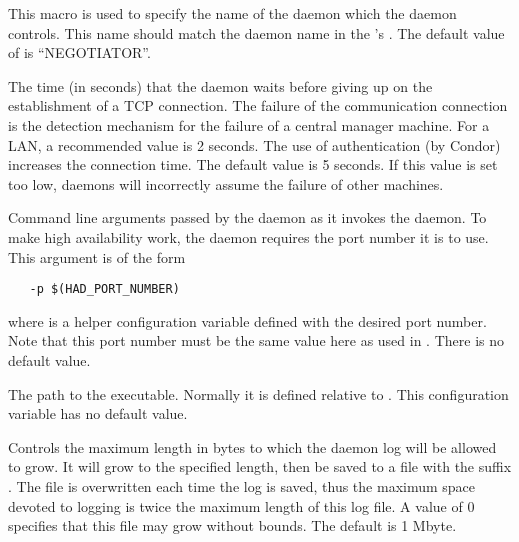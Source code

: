 \begin{description}
\label{param:HADControllee}
\item[\Macro{HAD\_CONTROLLEE}]
  This macro is used to specify the name of the daemon which the
   daemon controls.   This name should match the daemon
  name in the 's .  The default
  value of  is ``NEGOTIATOR''.

\label{param:HADConnectionTimeout}
\item[\Macro{HAD\_CONNECTION\_TIMEOUT}]
  The time (in seconds) that the  daemon waits before giving
  up on the establishment of a TCP connection.
  The failure of the communication connection
  is the detection mechanism for the failure of a central
  manager machine.
  For a LAN, a recommended value is 2 seconds.
  The use of authentication (by Condor) increases the connection
  time.
  The default value is 5 seconds.
  If this value is set too low,
   daemons will incorrectly assume
  the failure of other machines.

\label{param:HADArgs}
\item[\Macro{HAD\_ARGS}]
  Command line arguments passed by the  daemon
  as it invokes the  daemon.
  To make high availability work, the  daemon
  requires the port number it is to use.
  This argument is of the form
  \begin{verbatim}
   -p $(HAD_PORT_NUMBER)
  \end{verbatim}
  where  is a helper configuration variable
  defined with the desired port number.
  Note that this port number must be the same value here as
  used in .
  There is no default value.


\label{param:HAD}
\item[\Macro{HAD}]
  The path to the  executable. Normally it is defined
  relative to .
  This configuration variable has no default value.

\label{param:MaxHADLog}
\item[\Macro{MAX\_HAD\_LOG}]
  Controls the maximum length in bytes to which the 
  daemon log will be allowed to grow. It will grow to the specified length,
  then be saved to a file with the suffix . 
  The   file is overwritten each time the log is saved,
  thus the maximum space devoted to logging is twice the maximum length
  of this log file.
  A value of 0 specifies that this file may grow without bounds.
  The default is 1 Mbyte.


\end{description}
